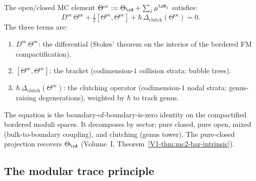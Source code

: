 \begin{theorem}
\label{thm:modular-mc}
The open/closed MC element
$\Theta^{\mathrm{oc}} :=
\Theta_\cA + \sum_j \mu^{\cM_j}$
satisfies:
\begin{equation}\label{eq:modular-mc-v2}
 D^{\mathrm{oc}}\,\Theta^{\mathrm{oc}}
 + \tfrac{1}{2}[\Theta^{\mathrm{oc}},\Theta^{\mathrm{oc}}]
 + \hbar\,\Delta_{\mathrm{clutch}}(\Theta^{\mathrm{oc}})
 = 0.
\end{equation}
The three terms are:
\begin{enumerate}[label=\textup{(\alph*)}]
\item $D^{\mathrm{oc}}\,\Theta^{\mathrm{oc}}$: the differential
 (Stokes' theorem on the interior of the bordered FM
 compactification).

\item $[\Theta^{\mathrm{oc}},\Theta^{\mathrm{oc}}]$: the bracket
 (codimension-$1$ collision strata: bubble trees).

\item $\hbar\,\Delta_{\mathrm{clutch}}(\Theta^{\mathrm{oc}})$:
 the clutching operator (codimension-$1$ nodal strata:
 genus-raising degenerations), weighted by $\hbar$ to track genus.
\end{enumerate}
The equation is the boundary-of-boundary-is-zero identity on the
compactified bordered moduli spaces. It decomposes by sector:
pure closed, pure open, mixed (bulk-to-boundary coupling), and
clutching (genus tower). The pure-closed projection recovers
$\Theta_\cA$ (Volume~I, Theorem~\ref*{V1-thm:mc2-bar-intrinsic}).
\end{theorem}

\subsection{The modular trace principle}

